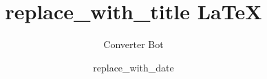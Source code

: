 \documentclass{article}
\begin{document}
\title{replace_with_title LaTeX}
\author{Converter Bot}
\date{replace_with_date}

\maketitle




\end{document}

